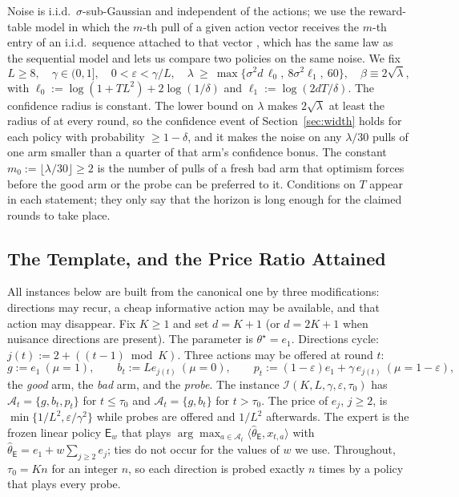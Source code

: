 \documentclass[anon]{alt2027} %
\newcommand{\eps}{\varepsilon}
\newcommand{\Exp}{\mathsf{E}}
\begin{document}
Noise is i.i.d.\ $\sigma$-sub-Gaussian and independent of the actions; we use
the reward-table model in which the $m$-th pull of a given action vector
receives the $m$-th entry of an i.i.d.\ sequence attached to that vector
\citep[\S4.6]{lattimore2020bandit}, which has the same law as the sequential
model and lets us compare two policies on the same noise. We fix
\begin{equation}
\label{eq:conventions}
L\ge8,\quad \gamma\in(0,1],\quad 0<\eps<\gamma/L,\quad
\lambda\ \ge\ \max\bigl\{\sigma^2d\,\ell_0,\ 8\sigma^2\ell_1,\ 60\bigr\},\quad
\beta\equiv2\sqrt\lambda,
\end{equation}
with $\ell_0:=\log(1+TL^2)+2\log(1/\delta)$ and $\ell_1:=\log(2dT/\delta)$.
The confidence radius is constant. The lower bound on $\lambda$ makes
$2\sqrt\lambda$ at least the radius of \citet{abbasi2011improved} at every
round, so the confidence event of Section~\ref{sec:width} holds for each
policy with probability $\ge1-\delta$, and it makes the noise on any $\lambda/30$
pulls of one arm smaller than a quarter of that arm's confidence bonus. The
constant $m_0:=\lfloor\lambda/30\rfloor\ge2$ is the number of pulls of a
fresh bad arm that optimism forces before the good arm or the probe can be
preferred to it. Conditions on $T$ appear in each statement; they only say
that the horizon is long enough for the claimed rounds to take place.


\subsection{The Template, and the Price Ratio Attained}
\label{app:template-thm}

All instances below are built from the canonical one by three modifications:
directions may recur, a cheap informative action may be available, and that
action may disappear. Fix $K\ge1$ and set $d=K+1$ (or $d=2K+1$ when nuisance
directions are present). The parameter is $\theta^\star=e_1$. Directions
cycle: $j(t):=2+((t-1)\bmod K)$. Three actions may be offered at round $t$:
\[
g:=e_1\ (\mu=1),\qquad
b_t:=Le_{j(t)}\ (\mu=0),\qquad
p_t:=(1-\eps)e_1+\gamma\,e_{j(t)}\ (\mu=1-\eps),
\]
the \emph{good} arm, the \emph{bad} arm, and the \emph{probe}. The instance
$\mathcal I(K,L,\gamma,\eps,\tau_0)$ has $\mathcal A_t=\{g,b_t,p_t\}$ for $t\le\tau_0$
and $\mathcal A_t=\{g,b_t\}$ for $t>\tau_0$. The price of $e_j$, $j\ge2$, is
$\min\{1/L^2,\eps/\gamma^2\}$ while probes are offered and $1/L^2$ afterwards. The
expert is the frozen linear policy $\Exp_w$ that plays
$\arg\max_{a\in\mathcal A_t}\langle\widehat\theta_{\Exp},x_{t,a}\rangle$ with
$\widehat\theta_{\Exp}=e_1+w\sum_{j\ge2}e_j$; ties do not occur for the values
of $w$ we use. Throughout, $\tau_0=Kn$ for an integer $n$, so each direction is
probed exactly $n$ times by a policy that plays every probe.
\end{document}

